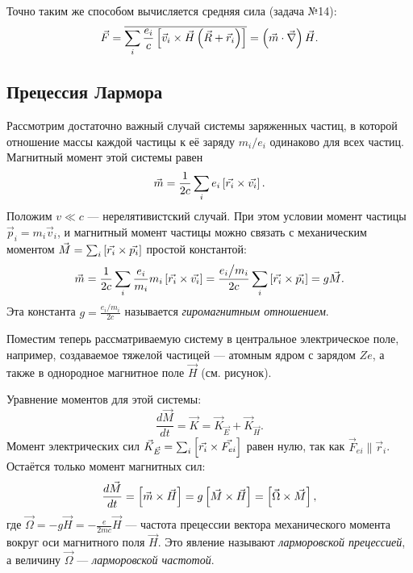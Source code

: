     Точно таким же способом вычисляется средняя сила (задача №14):
    \[
        \vec{F} = \overline{\sum_i \frac{e_i}{c} \left[{\vec{v}_i \times \vec{H}\left({\vec{R} + \vec{r}_i}\right)}\right]} = \left({\vec{m}\cdot\vec{\nabla}}\right)\vec{H}.
    \]

\subsection{Прецессия Лармора}
    Рассмотрим достаточно важный случай системы заряженных частиц, в которой отношение массы каждой частицы к её заряду $m_i \big/ e_i$ одинаково для всех частиц.
    Магнитный момент этой системы равен
    \[
        \vec{m} = \frac 1{2c} \sum_i e_i \left[{\vec{r_i}\times\vec{v_i}}\right].
    \]
    Положим $v \ll c$ --- нерелятивистский случай. При этом условии момент частицы $\vec{p}_i = m_i \vec{v}_i$, и магнитный момент частицы
    можно связать с механическим моментом $\vec{M} = \sum_i \left[{\vec{r_i}\times\vec{p_i}}\right] $ простой константой: 
    \[
        \vec{m} = \frac 1{2c}\sum_i \frac{e_i}{m_i}m_i\left[{\vec{r_i}\times\vec{v_i}}\right] = \frac{e_i \big/ m_i}{2c}\sum_i\left[{\vec{r_i}\times\vec{p_i}}\right] = g\vec{M}.
    \]
    Эта константа $g = \frac{e_i \big/ m_i}{2c}$ называется \textit{гиромагнитным отношением}.
    
    Поместим теперь рассматриваемую систему в центральное электрическое поле, например, создаваемое тяжелой частицей --- 
    атомным ядром с зарядом $Ze$, а также в однородное магнитное поле $\vec{H}$ (см. рисунок).

    \begin{figure}[h]
        \centering{
            
        }
    \end{figure}

    Уравнение моментов для этой системы:
    \[
        \frac{d\vec{M}}{dt} = \vec{K} = \vec{K}_{\vec{E}} + \vec{K}_{\vec{H}}.
    \]
    Момент электрических сил $\vec{K}_{\vec{E}} = \sum_i \left[{\vec{r_i}\times\vec{F_{ei}}}\right]$ равен нулю, так как $\vec{F}_{ei} \parallel \vec{r}_i$.
    Остаётся только момент магнитных сил:
    \[
        \frac{d\vec{M}}{dt} = \left[{\vec{m}\times\vec{H}}\right] = g\left[{\vec{M}\times\vec{H}}\right] = \left[{\vec{\Omega}\times\vec{M}}\right],
    \]
    где $\vec{\Omega} = -g\vec{H} = -\frac{e}{2mc}\vec{H}$ --- частота прецессии вектора механического момента вокруг оси
    магнитного поля $\vec{H}$. Это явление называют \textit{ларморовской прецессией}, а величину $\vec{\Omega}$ --- \textit{ларморовской частотой}.